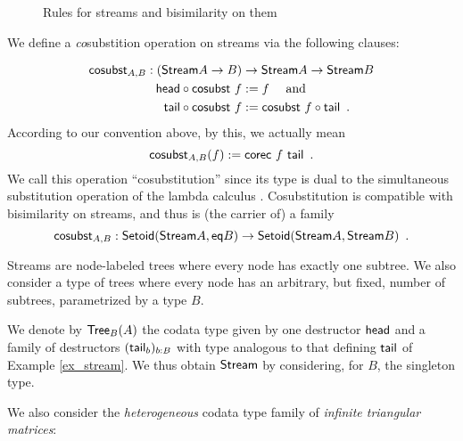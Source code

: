 \documentclass[a4paper,USenglish]{lipics}
\newcommand{\parencite}[1]{\cite{#1}}
\begin{document}
\begin{example}
\begin{figure}
 \begin{mdframed}
  
 \end{mdframed}
 \caption{Rules for streams and bisimilarity on them} \label{stream_rules}
\end{figure}

  
  We define a \emph{co}substition operation  on streams via the following clauses:
    
   \begin{align*} 
                  \sredec_{A,B} : (\stream A \to B) &\to \stream A\to\stream B \\
                  \comp{\sredec~f}{\shead} &:= f \quad\text{ and } \quad \\
                  \comp{\sredec~f}{\stail} &:= \comp{\stail}{\sredec~f} \enspace . %
    \end{align*}
  According to our convention above, by this, we actually mean
  \[  \mathsf{cosubst}_{A,B}(f) := \mathsf{corec}~f~\mathsf{tail} \enspace . \]
  We call this operation \enquote{cosubstitution} since its type is dual to the simultaneous substitution operation 
  of the lambda calculus \parencite{alt_reus}. 
  Cosubstitution is compatible with bisimilarity on streams, and thus is (the carrier of) a family
  \[ \mathsf{cosubst}_{A,B} : \mathsf{Setoid}(\mathsf{Stream} A, \mathsf{eq} B) \to \mathsf{Setoid}(\mathsf{Stream} A,\mathsf{Stream} B) \enspace . \]

\end{example}


\noindent
Streams are node-labeled trees where every node has exactly one subtree.
We also consider a type of trees where every node has an arbitrary, but fixed, number of subtrees, 
parametrized by a type $B$.



\begin{example}\label{ex_trees}
 We denote by $\mathsf{Tree}_B(A)$ the codata type given by one destructor $\mathsf{head}$ and a family of 
 destructors $(\mathsf{tail}_b)_{b:B}$ with type analogous to that defining $\mathsf{tail}$ of Example \ref{ex_stream}.
 We thus obtain $\mathsf{Stream}$ by considering, for $B$, the singleton type.
\end{example}


We also consider the \emph{heterogeneous} codata type family of \emph{infinite triangular matrices}:
\end{document}
